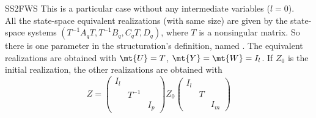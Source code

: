 \begin{command}[SS2FWS]{SS2FWS}
This is a particular case without any intermediate variables ($l=0$).\\
All the state-space equivalent realizations (with same size) are given by the state-space systems $(T^{-1}A_qT,T^{-1}B_q,C_qT,D_q)$, where $T$ is a nonsingular matrix.
So there is one parameter in the structuration's definition, named . The equivalent realizations are obtained with $\mt{U}=T$, $\mt{Y}=\mt{W}=I_{l}$. If $Z_0$ is the initial realization, the other realizations are obtained with
\begin{equation}
Z = \begin{pmatrix} I_{l} \\ & T^{-1} \\ && I_{p} \end{pmatrix} Z_0 \begin{pmatrix} I_{l} \\ & T \\ && I_{m} \end{pmatrix}
\end{equation}
\end{command}


